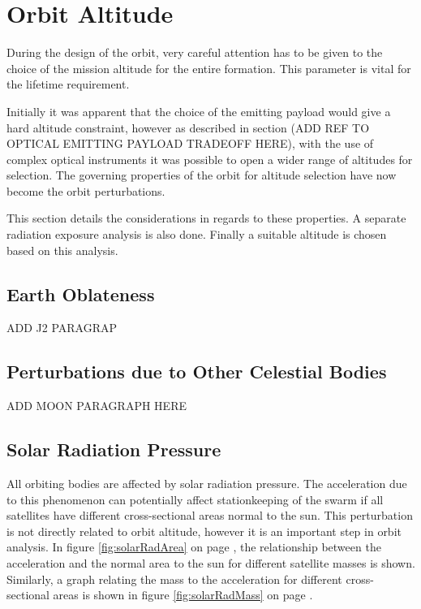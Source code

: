 \section{Orbit Altitude}
\label{mtrOrbAltitude}
During the design of the orbit, very careful attention has to be given to the choice of the mission altitude for the entire formation. This parameter is vital for the lifetime requirement.

Initially it was apparent that the choice of the emitting payload would give a hard altitude constraint, however as described in section (ADD REF TO OPTICAL EMITTING PAYLOAD TRADEOFF HERE), with the use of complex optical instruments it was possible to open a wider range of altitudes for selection. The governing properties of the orbit for altitude selection have now become the orbit perturbations.

This section details the considerations in regards to these properties. A separate radiation exposure analysis is also done. Finally a suitable altitude is chosen based on this analysis.
\subsection{Earth Oblateness}
\label{mtrOrbJ2}
ADD J2 PARAGRAP
\subsection{Perturbations due to Other Celestial Bodies}
\label{mtrOrbSelestialBodies}
ADD MOON PARAGRAPH HERE
\subsection{Solar Radiation Pressure}
\label{mtrOrbSolRadiation}
All orbiting bodies are affected by solar radiation pressure. The acceleration due to this phenomenon can potentially affect stationkeeping of the swarm if all satellites have different cross-sectional areas normal to the sun. This perturbation is not directly related to orbit altitude, however it is an important step in orbit analysis. In figure \ref{fig:solarRadArea} on page \pageref{fig:solarRadArea}, the relationship between the acceleration and the normal area to the sun for different satellite masses is shown. Similarly, a graph relating the mass to the acceleration for different cross-sectional areas is shown in figure \ref{fig:solarRadMass} on page \pageref{fig:solarRadMass}.

